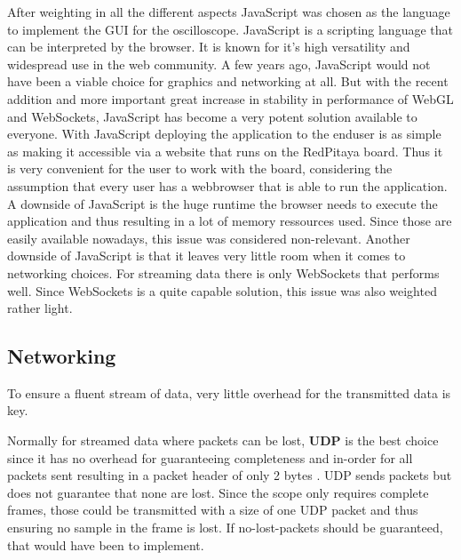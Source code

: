 After weighting in all the different aspects JavaScript was chosen as the language to implement the GUI for the oscilloscope. JavaScript is a scripting language that can be interpreted by the browser.
It is known for it's high versatility and widespread use in the web community.
A few years ago, JavaScript would not have been a viable choice for graphics and networking at all. But with the recent addition and more important great increase in stability in performance of WebGL and WebSockets, JavaScript has become a very potent solution available to everyone.
With JavaScript deploying the application to the enduser is as simple as making it accessible via a website that runs on the RedPitaya board. Thus it is very convenient for the user to work with the board, considering the assumption that every user has a webbrowser that is able to run the application.
A downside of JavaScript is the huge runtime the browser needs to execute the application and thus resulting in a lot of memory ressources used. Since those are easily available nowadays, this issue was considered non-relevant.
Another downside of JavaScript is that it leaves very little room when it comes to networking choices. For streaming data there is only WebSockets that performs well. Since WebSockets is a quite capable solution, this issue was also weighted rather light.

%
%

\subsection{Networking}

To ensure a fluent stream of data, very little overhead for the transmitted data is key.

Normally for streamed data where packets can be lost, \textbf{UDP} is the best choice since it has no overhead for guaranteeing completeness and in-order for all packets sent resulting in a packet header of only 2 bytes \cite{TODO: refrence}.
UDP sends packets but does not guarantee that none are lost. Since the scope only requires complete frames, those could be transmitted with a size of one UDP packet and thus ensuring no sample in the frame is lost. If no-lost-packets should be guaranteed, that would have been to implement.

